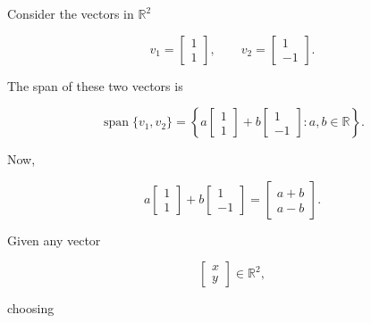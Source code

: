\begin{example}
	Consider the vectors in \(\mathbb{R}^2\)

	\begin{equation}
		v_1=
		\begin{bmatrix}
			1 \\
			1
		\end{bmatrix},
		\qquad
		v_2=
		\begin{bmatrix}
			1 \\
			-1
		\end{bmatrix}.
		\label{eq:basis-and-dimension-of-r-8}
	\end{equation}

	The span of these two vectors is

	\begin{equation}
		\operatorname{span}\{v_1,v_2\}
		=
		\left\{
		a
		\begin{bmatrix}
			1 \\1
		\end{bmatrix}
		+
		b
		\begin{bmatrix}
			1 \\-1
		\end{bmatrix}
		:
		a,b\in\mathbb{R}
		\right\}.
		\label{eq:basis-and-dimension-of-r-9}
	\end{equation}

	Now,

	\begin{equation}
		a
		\begin{bmatrix}
			1 \\1
		\end{bmatrix}
		+
		b
		\begin{bmatrix}
			1 \\-1
		\end{bmatrix}
		=
		\begin{bmatrix}
			a+b \\
			a-b
		\end{bmatrix}.
		\label{eq:basis-and-dimension-of-r-10}
	\end{equation}

	Given any vector

	\begin{equation}
		\begin{bmatrix}
			x \\y
		\end{bmatrix}
		\in\mathbb{R}^2,
		\label{eq:basis-and-dimension-of-r-11}
	\end{equation}

	choosing


\end{example}
